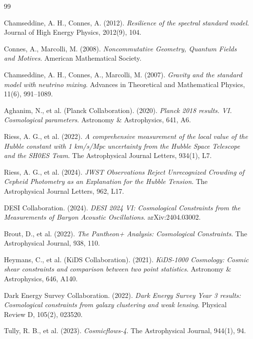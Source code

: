 \documentclass[11pt, a4paper]{article}
\theoremstyle{plain}
\theoremstyle{definition}
\begin{document}
\begin{thebibliography}{99}
\small

Chamseddine, A. H., Connes, A. (2012). \textit{Resilience of the spectral standard model}. Journal of High Energy Physics, 2012(9), 104.

Connes, A., Marcolli, M. (2008). \textit{Noncommutative Geometry, Quantum Fields and Motives}. American Mathematical Society.

Chamseddine, A. H., Connes, A., Marcolli, M. (2007). \textit{Gravity and the standard model with neutrino mixing}. Advances in Theoretical and Mathematical Physics, 11(6), 991–1089.

Aghanim, N., et al. (Planck Collaboration). (2020). \textit{Planck 2018 results. VI. Cosmological parameters}. Astronomy \& Astrophysics, 641, A6.

Riess, A. G., et al. (2022). \textit{A comprehensive measurement of the local value of the Hubble constant with 1 km/s/Mpc uncertainty from the Hubble Space Telescope and the SH0ES Team}. The Astrophysical Journal Letters, 934(1), L7.

Riess, A. G., et al. (2024). \textit{JWST Observations Reject Unrecognized Crowding of Cepheid Photometry as an Explanation for the Hubble Tension}. The Astrophysical Journal Letters, 962, L17.

DESI Collaboration. (2024). \textit{DESI 2024 VI: Cosmological Constraints from the Measurements of Baryon Acoustic Oscillations}. arXiv:2404.03002.

Brout, D., et al. (2022). \textit{The Pantheon+ Analysis: Cosmological Constraints}. The Astrophysical Journal, 938, 110.

Heymans, C., et al. (KiDS Collaboration). (2021). \textit{KiDS-1000 Cosmology: Cosmic shear constraints and comparison between two point statistics}. Astronomy \& Astrophysics, 646, A140.

Dark Energy Survey Collaboration. (2022). \textit{Dark Energy Survey Year 3 results: Cosmological constraints from galaxy clustering and weak lensing}. Physical Review D, 105(2), 023520.

Tully, R. B., et al. (2023). \textit{Cosmicflows-4}. The Astrophysical Journal, 944(1), 94.


\end{thebibliography}
\end{document}
